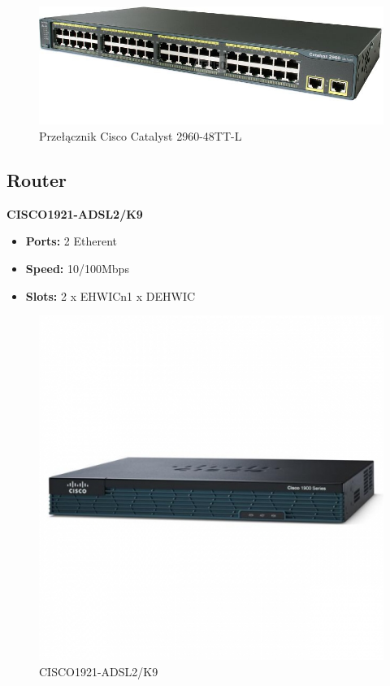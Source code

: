 \begin{figure}[htbp]
	\begin{center}
        \includegraphics[scale = 0.6]{img/switchL2.jpg}
        \caption{Przełącznik Cisco Catalyst 2960-48TT-L}
    \end{center}
\end{figure}

\newpage

 \subsection{Router}
 \textbf{CISCO1921-ADSL2/K9}
 \begin{itemize}
  	\item \textbf{Ports:} 2 Etherent
  	\item \textbf{Speed:} 10/100Mbps
 	\item \textbf{Slots:} 2 x EHWICn1 x DEHWIC
 \end{itemize}
 \begin{figure}[htbp]
	\begin{center}
        \includegraphics[scale = 0.6]{img/router.jpg}
        \caption{CISCO1921-ADSL2/K9}
    \end{center}
\end{figure}


